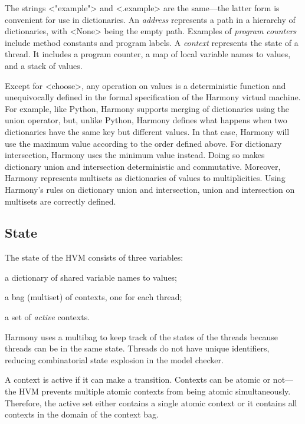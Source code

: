 \documentclass[twocolumn]{article}
\begin{document}
The strings <{"example"}> and <{.example}> are the same---the latter
form is convenient for use in dictionaries.
An \emph{address} represents a path in a hierarchy of dictionaries, with
<{None}> being the empty path.
Examples of \emph{program counters} include method constants and program labels.
A \emph{context} represents the state of a thread.  It includes a program
counter, a map of local variable names to values, and a stack of values.

Except for <{choose}>, any operation on values is a deterministic
function and unequivocally defined in the formal specification of the
Harmony virtual machine.
For example, like Python, Harmony supports merging of dictionaries
using the union operator, but, unlike Python, Harmony defines
what happens when two dictionaries have the same key but different values.
In that case, Harmony will use the maximum value according to the order
defined above.
For dictionary  intersection, Harmony uses the minimum value instead.
Doing so makes dictionary union and intersection deterministic and
commutative.  Moreover, Harmony represents multisets as dictionaries
of values to multiplicities.  Using Harmony's rules on dictionary union
and intersection, union and intersection on multisets are correctly
defined.

\subsection{State}

The state of the HVM consists of three variables:
\begin{compactitem}
\item a dictionary of shared variable names to values;
\item a bag (multiset) of contexts, one for each thread;
\item a set of \emph{active} contexts.
\end{compactitem}

Harmony uses a multibag to keep track of the states of the threads
because threads can be in the same state.
Threads do not have unique identifiers, reducing combinatorial
state explosion in the model checker.

A context is active if it can make a transition.
Contexts can be atomic or not---the HVM prevents multiple atomic
contexts from being atomic simultaneously.  Therefore, the active set
either contains a single atomic context or it contains all contexts
in the domain of the context bag.
\end{document}
